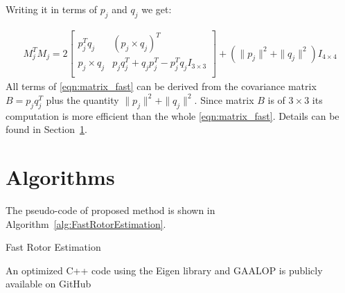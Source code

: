 \documentclass{birkjour}
\numberwithin{equation}{section}
\begin{document}
Writing it in terms of $p_j$ and $q_j$ we get:

\begin{eqnarray}
   \label{eqn:matrix_fast}
   	M_j^T M_j = 2
	\left[\begin{array}{cc}
		p_j^T q_j       &         (p_j \times q_j)^T \\
		p_j \times q_j  &    p_j q_j^T + q_j p_j^T - p_j^Tq_j I_{3\times3} \\
	\end{array}\right]
    + (\| p_j \|^2 + \| q_j \|^2) I_{4\times4}
\end{eqnarray}
All terms of \ref{eqn:matrix_fast} can be derived from the covariance matrix $B = p_j q_j^T$ plus the quantity $\| p_j \|^2 + \| q_j \|^2$. Since matrix $B$ is of $3\times3$ its computation is more efficient than the whole \ref{eqn:matrix_fast}. Details can be found in Section~\ref{section:algoritms}.

\section{Algorithms}
\label{section:algoritms}

The pseudo-code of proposed method is shown in Algorithm~\ref{alg:FastRotorEstimation}. 

\begin{algorithm}
\begin{algorithmic}[1]
\ENDFOR
{}
\REPEAT
{}
\end{algorithmic}
\caption{Fast Rotor Estimation}\label{alg:FastRotorEstimation}
\end{algorithm}
An optimized C++ code using the Eigen library \cite{Eigen} and GAALOP  \cite{Gaalop} is publicly available on GitHub \cite{GARotorEstimator}
\end{document}

